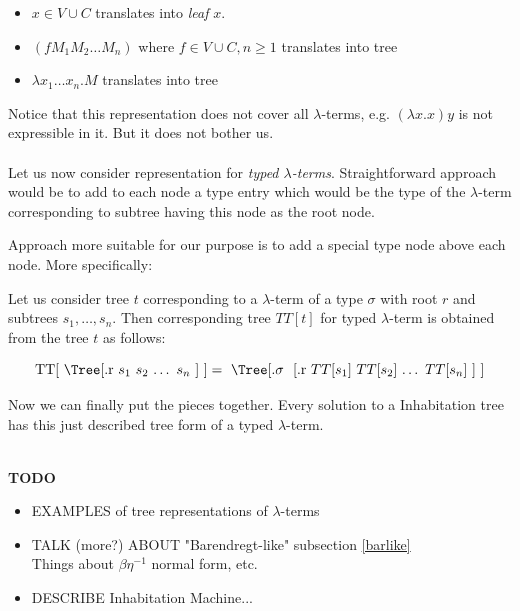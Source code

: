 \documentclass[12pt,a4paper]{report}
\newcommand{\Lets}{Let us\xspace}
\newcommand{\lterm}{$\lambda$-term\xspace}
\newcommand{\lterms}{$\lambda$-terms\xspace}
\begin{document}
\begin{itemize}
    \item $x \in V \cup C$ translates into \textit{leaf} $x$.
	\item $(f M_1 M_2 \dots M_n)$ where $f \in V \cup C, n \geq 1$ translates into tree\\
	\item $\lambda x_1 \dots x_n . M$ translates into tree\\
\end{itemize}

Notice that this representation does not cover all \lterms, 
e.g. $(\lambda x.x) y$ is not expressible in it. But it does not bother us.  
\\\\
\Lets now consider representation for \textit{typed \lterms}.
Straightforward approach would be to add to each node a type entry which 
would be the type of the \lterm corresponding to subtree having this
node as the root node. 

Approach more suitable for our purpose is to add a special type node above each node.
More specifically:

\Lets consider tree $t$ corresponding to a \lterm of a type
$\sigma$ with root $r$ and subtrees $s_1 , \dots , s_n$. 
Then corresponding tree $TT[t]$ for typed \lterm is 
obtained from the tree $t$ as follows:  

\begin{equation*}
\mbox{ 
TT[
\Tree
	[.r 	
	  	  \text{$s_1$}
		  \text{$s_2$}
		  \text{$\dots$}
		  \text{$s_n$}
	] 
}]=
\mbox{
\Tree
	[.\text{$\sigma$ }
	    [.r 	
	  	  \text{$TT[s_1]$}
		  \text{$TT[s_2]$}
		  \text{$\dots$}
		  \text{$TT[s_n]$}
		]	  	
	] 
}
\end{equation*}
	  	
Now we can finally put the pieces together. 
Every solution to a Inhabitation tree has this just described tree form of a typed \lterm. 
 

~\\
\textbf{TODO} 
\begin{itemize}
\item EXAMPLES of tree representations of \lterms  
\item TALK (more?) ABOUT "Barendregt-like" subsection \ref{barlike}\\
		Things about $\beta\eta^{-1}$ normal form, etc.   
\item DESCRIBE Inhabitation Machine... 
\end{itemize}
		
\end{document}

